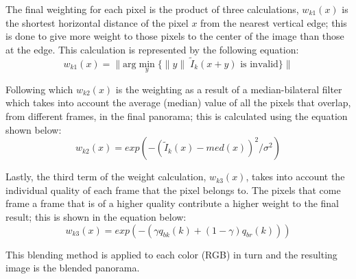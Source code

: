 The final weighting for each pixel is the product of three calculations, $w_{k1}(x)$ is the shortest horizontal 
distance of the pixel $x$ from the nearest vertical edge; this is done to give more weight to those pixels to 
the center of the image than those at the edge. This calculation is represented by the following equation:
\begin{equation}
w_{k1}(x) =  \| \text{arg} \displaystyle\min_{y}\{\|y\|\; \tilde{I}_k (x+y) \text{ is invalid} \}\|
\end{equation}

Following which $w_{k2}(x)$ is the weighting as a result of a median-bilateral filter which takes into account
the average (median) value of all the pixels that overlap, from different frames, in the final panorama; this
is calculated using the equation shown below:
\begin{equation}
w_{k2}(x) = exp (-(\tilde{I}_k(x)-med(x))^2/\sigma^2)
\end{equation}

Lastly, the third term of the weight calculation, $w_{k3}(x)$, takes into account the individual quality of 
each frame that the pixel belongs to. The pixels that come frame a frame that is of a higher quality contribute
a higher weight to the final result; this is shown in the equation below:
\begin{equation}
w_{k3}(x) = exp (-(\gamma q_{bk}(k) + (1 - \gamma)q_{br}(k)))
\end{equation}

This blending method is applied to each color (RGB) in turn and the resulting image is the blended panorama.